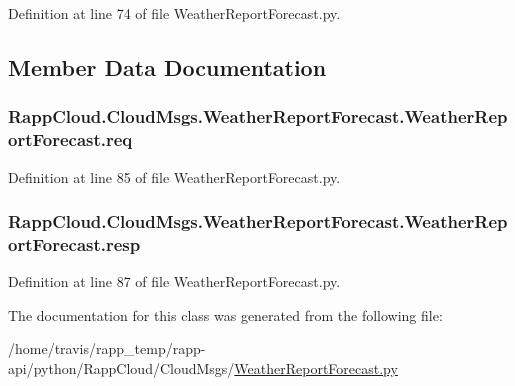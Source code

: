 Definition at line 74 of file Weather\-Report\-Forecast.\-py.



\subsection{Member Data Documentation}
\hypertarget{classRappCloud_1_1CloudMsgs_1_1WeatherReportForecast_1_1WeatherReportForecast_af6280b4244a053f384797a05ae1ec9c2}{
\subsubsection[{req}]{\setlength{\rightskip}{0pt plus 5cm}Rapp\-Cloud.\-Cloud\-Msgs.\-Weather\-Report\-Forecast.\-Weather\-Report\-Forecast.\-req}}\label{classRappCloud_1_1CloudMsgs_1_1WeatherReportForecast_1_1WeatherReportForecast_af6280b4244a053f384797a05ae1ec9c2}


Definition at line 85 of file Weather\-Report\-Forecast.\-py.

\hypertarget{classRappCloud_1_1CloudMsgs_1_1WeatherReportForecast_1_1WeatherReportForecast_a666e32ff92643879e9f9cb9e42f0762f}{
\subsubsection[{resp}]{\setlength{\rightskip}{0pt plus 5cm}Rapp\-Cloud.\-Cloud\-Msgs.\-Weather\-Report\-Forecast.\-Weather\-Report\-Forecast.\-resp}}\label{classRappCloud_1_1CloudMsgs_1_1WeatherReportForecast_1_1WeatherReportForecast_a666e32ff92643879e9f9cb9e42f0762f}


Definition at line 87 of file Weather\-Report\-Forecast.\-py.



The documentation for this class was generated from the following file\-:\begin{DoxyCompactItemize}
\item 
/home/travis/rapp\-\_\-temp/rapp-\/api/python/\-Rapp\-Cloud/\-Cloud\-Msgs/\hyperlink{WeatherReportForecast_8py}{Weather\-Report\-Forecast.\-py}\end{DoxyCompactItemize}
